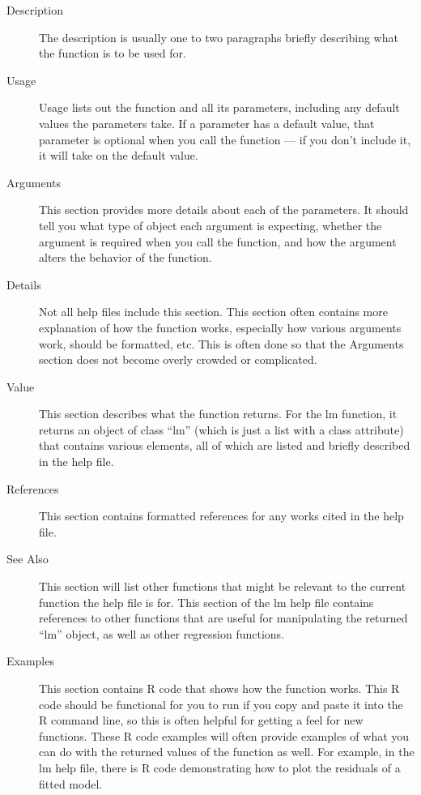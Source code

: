 \documentclass[12pt, oneside]{amsart}   	%
\begin{document}
\begin{description}
\item[Description] The description is usually one to two paragraphs briefly describing what the function is to be used for. 

\item[Usage] Usage lists out the function and all its parameters, including any default values the parameters take. If a parameter has a default value, that parameter is optional when you call the function --- if you don't include it, it will take on the default value.

\item[Arguments] This section provides more details about each of the parameters. It should tell you what type of object each argument is expecting, whether the argument is required when you call the function, and how the argument alters the behavior of the function. 

\item[Details] Not all help files include this section. This section often contains more explanation of how the function works, especially how various arguments work, should be formatted, etc. This is often done so that the Arguments section does not become overly crowded or complicated.

\item[Value] This section describes what the function returns. For the lm function, it returns an object of class ``lm'' (which is just a list with a class attribute) that contains various elements, all of which are listed and briefly described in the help file.

\item[References] This section contains formatted references for any works cited in the help file.

\item[See Also] This section will list other functions that might be relevant to the current function the help file is for. This section of the lm help file contains references to other functions that are useful for manipulating the returned ``lm'' object, as well as other regression functions. 

\item[Examples] This section contains R code that shows how the function works. This R code should be functional for you to run if you copy and paste it into the R command line, so this is often helpful for getting a feel for new functions. These R code examples will often provide examples of what you can do with the returned values of the function as well. For example, in the lm help file, there is R code demonstrating how to plot the residuals of a fitted model.

\end{description}
\end{document}

